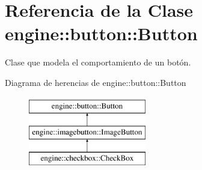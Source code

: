 \hypertarget{classengine_1_1button_1_1Button}{
\section{\-Referencia de la \-Clase engine\-:\-:button\-:\-:\-Button}
\label{classengine_1_1button_1_1Button}
}


\-Clase que modela el comportamiento de un botón.  


\-Diagrama de herencias de engine\-:\-:button\-:\-:\-Button\begin{figure}[H]
\begin{center}
\leavevmode
\includegraphics[height=3.000000cm]{classengine_1_1button_1_1Button}
\end{center}
\end{figure}

